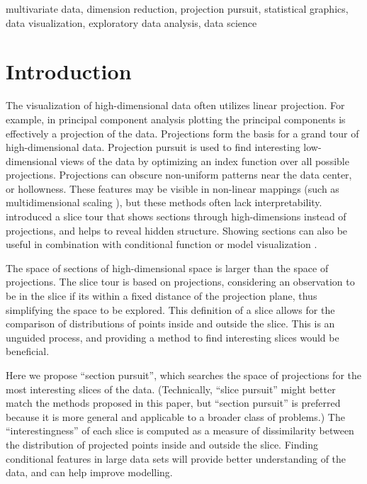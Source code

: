 \documentclass[]{interact}
\theoremstyle{plain}%
\theoremstyle{definition}
\theoremstyle{remark}
\begin{document}
\begin{keywords}
multivariate data, dimension reduction, projection pursuit, statistical
graphics, data visualization, exploratory data analysis, data science
\end{keywords}

\hypersetup{linkcolor=black}

\hypertarget{introduction}{%
\section{Introduction}\label{introduction}}

The visualization of high-dimensional data often utilizes linear
projection. For example, in principal component analysis plotting the
principal components is effectively a projection of the data.
Projections form the basis for a grand tour \citep{As85} of
high-dimensional data. Projection pursuit \citep[\citet{FT74}]{kr69} is
used to find interesting low-dimensional views of the data by optimizing
an index function over all possible projections. Projections can obscure
non-uniform patterns near the data center, or hollowness. These features
may be visible in non-linear mappings (such as multidimensional scaling
\citep{mds}), but these methods often lack interpretability.
\citet{laa2019slice} introduced a slice tour that shows sections through
high-dimensions instead of projections, and helps to reveal hidden
structure. Showing sections can also be useful in combination with
conditional function or model visualization
\citep[\citet{sliceplorer}]{JSSv081i05}.

The space of sections of high-dimensional space is larger than the space
of projections. The slice tour is based on projections, considering an
observation to be in the slice if its within a fixed distance of the
projection plane, thus simplifying the space to be explored. This
definition of a slice allows for the comparison of distributions of
points inside and outside the slice. This is an unguided process, and
providing a method to find interesting slices would be beneficial.

Here we propose ``section pursuit'', which searches the space of
projections for the most interesting slices of the data. (Technically,
``slice pursuit'' might better match the methods proposed in this paper,
but ``section pursuit'' is preferred because it is more general and
applicable to a broader class of problems.) The ``interestingness'' of
each slice is computed as a measure of dissimilarity between the
distribution of projected points inside and outside the slice. Finding
conditional features in large data sets will provide better
understanding of the data, and can help improve modelling.
\end{document}
